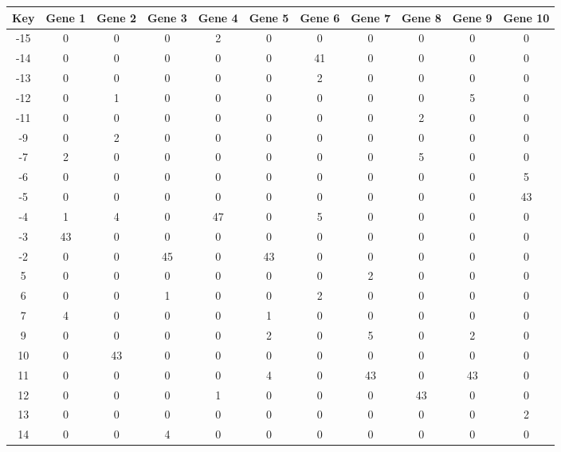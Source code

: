\begin{tabular}{|c|c|c|c|c|c|c|c|c|c|c|}
\hline
Key & Gene 1 & Gene 2 & Gene 3 & Gene 4 & Gene 5 & Gene 6 & Gene 7 & Gene 8 & Gene 9 & Gene 10 \\
\hline
-15 & 0 & 0 & 0 & 2 & 0 & 0 & 0 & 0 & 0 & 0 \\
-14 & 0 & 0 & 0 & 0 & 0 & 41 & 0 & 0 & 0 & 0 \\
-13 & 0 & 0 & 0 & 0 & 0 & 2 & 0 & 0 & 0 & 0 \\
-12 & 0 & 1 & 0 & 0 & 0 & 0 & 0 & 0 & 5 & 0 \\
-11 & 0 & 0 & 0 & 0 & 0 & 0 & 0 & 2 & 0 & 0 \\
-9 & 0 & 2 & 0 & 0 & 0 & 0 & 0 & 0 & 0 & 0 \\
-7 & 2 & 0 & 0 & 0 & 0 & 0 & 0 & 5 & 0 & 0 \\
-6 & 0 & 0 & 0 & 0 & 0 & 0 & 0 & 0 & 0 & 5 \\
-5 & 0 & 0 & 0 & 0 & 0 & 0 & 0 & 0 & 0 & 43 \\
-4 & 1 & 4 & 0 & 47 & 0 & 5 & 0 & 0 & 0 & 0 \\
-3 & 43 & 0 & 0 & 0 & 0 & 0 & 0 & 0 & 0 & 0 \\
-2 & 0 & 0 & 45 & 0 & 43 & 0 & 0 & 0 & 0 & 0 \\
5 & 0 & 0 & 0 & 0 & 0 & 0 & 2 & 0 & 0 & 0 \\
6 & 0 & 0 & 1 & 0 & 0 & 2 & 0 & 0 & 0 & 0 \\
7 & 4 & 0 & 0 & 0 & 1 & 0 & 0 & 0 & 0 & 0 \\
9 & 0 & 0 & 0 & 0 & 2 & 0 & 5 & 0 & 2 & 0 \\
10 & 0 & 43 & 0 & 0 & 0 & 0 & 0 & 0 & 0 & 0 \\
11 & 0 & 0 & 0 & 0 & 4 & 0 & 43 & 0 & 43 & 0 \\
12 & 0 & 0 & 0 & 1 & 0 & 0 & 0 & 43 & 0 & 0 \\
13 & 0 & 0 & 0 & 0 & 0 & 0 & 0 & 0 & 0 & 2 \\
14 & 0 & 0 & 4 & 0 & 0 & 0 & 0 & 0 & 0 & 0 \\
\hline
\end{tabular}